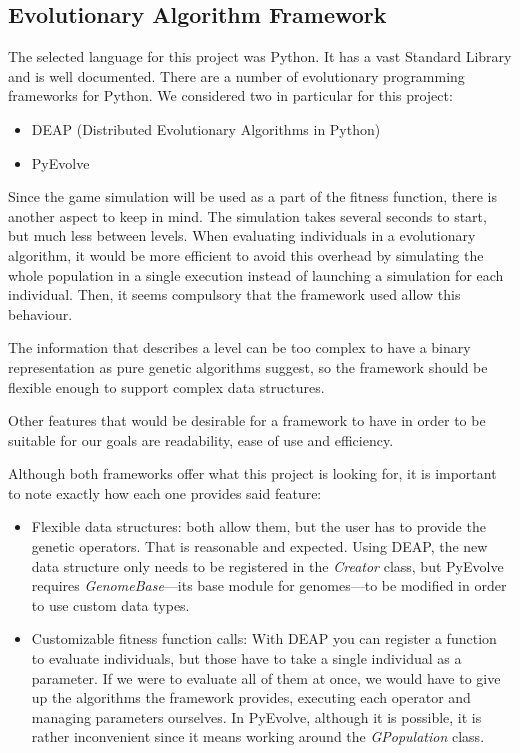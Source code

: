 
\subsection{Evolutionary Algorithm Framework}\label{ch:frameworkSelection}

The selected language for this project was Python. It has a vast Standard Library and is well documented. There are a number of evolutionary programming frameworks for Python. We considered two in particular for this project: 

\begin{itemize}
	\item DEAP (Distributed Evolutionary Algorithms in Python)\cite{fortin2012deap}
	\item PyEvolve\cite{perone2009pyevolve}
\end{itemize}

Since the game simulation will be used as a part of the fitness function, there is another aspect to keep in mind. The simulation takes several seconds to start, but much less between levels. When evaluating individuals in a evolutionary algorithm, it would be more efficient to avoid this overhead by simulating the whole population in a single execution instead of launching a simulation for each individual. Then, it seems compulsory that the framework used allow this behaviour.

The information that describes a level can be too complex to have a binary representation as pure genetic algorithms suggest, so the framework should be flexible enough to support complex data structures. 

Other features that would be desirable for a framework to have in order to be suitable for our goals are readability, ease of use and efficiency.

Although both frameworks offer what this project is looking for, it is important to note exactly how each one provides said feature:

\begin{itemize}
	\item Flexible data structures: both allow them, but the user has to provide the genetic operators. That is reasonable and expected. Using DEAP, the new data structure only needs to be registered in the \textit{Creator} class, but PyEvolve requires \textit{GenomeBase}---its base module for genomes---to be modified in order to use custom data types.
	\item Customizable fitness function calls: With DEAP you can register a function to evaluate individuals, but those have to take a single individual as a parameter. If we were to evaluate all of them at once, we would have to give up the algorithms the framework provides, executing each operator and managing parameters ourselves. In PyEvolve, although it is possible, it is rather inconvenient since it means working around the \textit{GPopulation} class.
\end{itemize}

